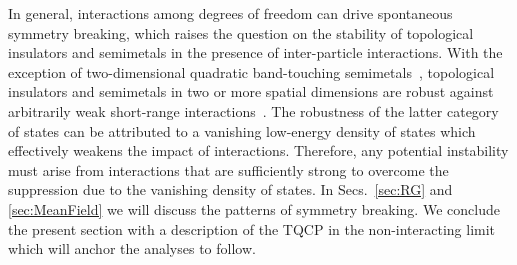 \documentclass[reprint,floatfix, twocolumn]{revtex4-1}
\begin{document}
In general, interactions among degrees of freedom can drive spontaneous symmetry breaking, which  raises the question on the stability of topological insulators and semimetals in the presence of inter-particle interactions. 
With the exception of two-dimensional quadratic band-touching semimetals~\cite{sun2009, vafek2010}, topological insulators and semimetals in two or more spatial dimensions are  robust against arbitrarily weak short-range interactions~\cite{herbut2009theory, maciejko2014weyl, sur2016instabilities, roy2017interacting}. 
The robustness of the latter category of states can be attributed to a vanishing low-energy density of states which effectively weakens the impact of interactions.
Therefore, any potential instability must arise from interactions that are sufficiently strong to overcome the suppression due to the vanishing density of states.
In Secs.~\ref{sec:RG} and \ref{sec:MeanField} we will discuss the patterns of symmetry breaking. We conclude the present section with a description of the TQCP in the non-interacting limit which will anchor the analyses to follow.
\end{document}
